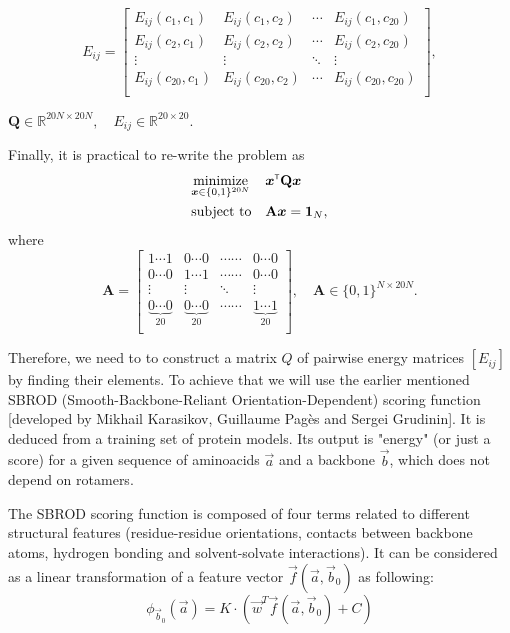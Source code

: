 \documentclass[12pt,twoside]{article}
\begin{document}
\[E_{ij} = 
\begin{bmatrix} E_{ij}(c_1,c_1) & E_{ij}(c_1,c_2)& \cdots & E_{ij}(c_1,c_{20}) \\
		     E_{ij}(c_2,c_1) & E_{ij}(c_2,c_2)& \cdots & E_{ij}(c_2,c_{20}) \\
		     \vdots	& \vdots	&	\ddots      &   \vdots \\
		     E_{ij}(c_{20},c_1) & E_{ij}(c_{20},c_2)& \cdots & E_{ij}(c_{20},c_{20}) \\
\end{bmatrix}, 						\]
\begin{center}
 $\mathbf{Q} \in \mathbb{R}^{20N\times20N},\quad E_{ij} \in \mathbb{R}^{20\times20} $.
\end{center}\par\bigskip
Finally, it is practical to re-write the problem as
\begin{equation}
\label{4}
\begin{aligned}
	&\underset{\vec{x}\in\{0,1\}^{20N}}{\text{minimize}} &&\vec{x}\T\mathbf{Q}\vec{x} \\
	&\text{subject to} && \mathbf{A}\vec{x} = \mathbf{1}_N,
\end{aligned}
\end{equation}
where 
\[ \mathbf{A} = 
\begin{bmatrix} 1 \cdots 1 & 0 \cdots 0 & \cdots\cdots & 0\cdots 0 \\
		     0 \cdots 0 & 1 \cdots 1 & \cdots\cdots & 0\cdots 0 \\
		     \vdots	& \vdots	&	\ddots      &   \vdots \\
		     \underbrace{0 \cdots 0 }_{20}& \underbrace{0 \cdots 0 }_{20} & \cdots\cdots & \underbrace{1 \cdots 1 }_{20} \\   
\end{bmatrix},  \quad\mathbf{A} \in \{0,1\}^{N\times20N}. \]\par


Therefore, we need to to construct a matrix $Q$ of pairwise energy matrices $[E_{ij}]$ by finding their elements.
\newline
To achieve that we will use the earlier mentioned SBROD (Smooth-Backbone-Reliant Orientation-Dependent) scoring function [developed by Mikhail Karasikov, Guillaume Pagès and Sergei Grudinin]. It is deduced
from a training set of protein models. Its output is "energy" (or just a score) for a given sequence of aminoacids $\vec{a}$ and a backbone $\vec{b}$, which does not depend on rotamers.

The SBROD scoring function is composed of four terms related to
different structural features (residue-residue orientations, contacts between backbone atoms, hydrogen
bonding and solvent-solvate interactions). It can be considered as a linear transformation of a feature vector $\vec{f}(\vec{a},\vec{b}_0)$ as following:
\begin{equation}
\label{11}
\phi_{\vec{b}_0}(\vec{a})
=K\cdot(\vec{w}^T \vec{f}(\vec{a},\vec{b}_0)+C)
\end{equation}
\end{document}
